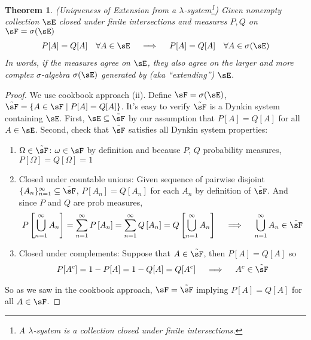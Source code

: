\documentclass[12pt]{article}
\theoremstyle{plain}
\newtheorem{thm}{Theorem}[section]
\theoremstyle{definition}
\theoremstyle{remark}
\newcommand{\sumninf}{\sum^\infty_{n=1}}
\newcommand{\ninf}{_{n=1}^\infty}
\begin{document}
\begin{thm}
\emph{(Uniqueness of Extension from a $\lambda$-system\footnote{%
  A $\lambda$-system is a collection closed under finite intersections.
})}
\label{thm:PQunq}
Given nonempty collection $\sE$ closed under finite intersections and
measures $P,Q$ on $\sF=\sigma(\sE)$
\begin{align*}
  P[A]=Q[A]
  \quad \forall A\in\sE
  \quad\implies\quad
  P[A]=Q[A]
  \quad \forall A\in\sigma(\sE)
\end{align*}
In words, if the measures agree on $\sE$, they also agree on the larger
and more complex $\sigma$-algebra $\sigma(\sE)$ generated by
(aka ``extending'') $\sE$.
\end{thm}
\begin{proof}
We use cookbook approach (ii). Define $\sF = \sigma(\sE)$,
$\tilde{\sF} = \{A\in \sF\;|\;P[A]=Q[A]\}$.
It's easy to verify $\tilde{\sF}$ is a Dynkin system
containing $\sE$.
First, $\sE\subseteq \tilde{\sF}$ by our assumption that
$P[A]=Q[A]$ for all $A\in\sE$.
Second, check that $\tilde{\sF}$ satisfies all Dynkin system properties:
\begin{enumerate}
  \item $\Omega\in\tilde{\sF}$:
    $\omega\in\sF$ by definition and because $P$, $Q$ probability
    measures, $P[\Omega]=Q[\Omega]=1$
  \item Closed under countable unions:
    Given sequence of pairwise disjoint $\{A_n\}\ninf\subseteq
    \tilde{\sF}$, $P[A_n]=Q[A_n]$ for each $A_n$ by definition
    of $\tilde{\sF}$.
    And since $P$ and $Q$ are prob measures,
    \begin{align*}
      P\left[\bigcup\ninf A_n\right]
      =
      \sumninf P\left[A_n\right]
      =
      \sumninf Q\left[A_n\right]
      =
      Q\left[\bigcup\ninf A_n\right]
      \quad\implies\quad
      \bigcup\ninf A_n \in\tilde{\sF}
    \end{align*}

  \item Closed under complements: Suppose that $A\in \tilde{\sF}$, then
    $P[A]=Q[A]$ so
    \begin{align*}
      P[A^c] = 1 - P[A]
      = 1-Q[A] = Q[A^c]
      \quad\implies\quad
      A^c\in\tilde{\sF}
    \end{align*}
\end{enumerate}
So as we saw in the cookbook approach, $\sF=\tilde{\sF}$ implying
$P[A]=Q[A]$ for all $A\in\sF$.
\end{proof}
\clearpage
\end{document}
